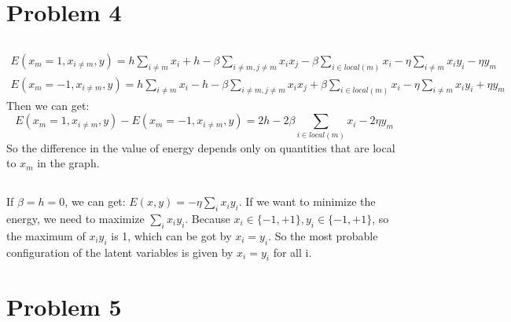 \documentclass[twoside]{article}
\begin{document}
\section{Problem 4}
\subsection{}
\begin{align*}
E(x_m=1, x_{i \neq m}, y) =  h\sum_{i\neq m}x_i + h -\beta \sum_{i\neq m, j\neq m}x_i x_j - \beta \sum_{i\in local(m)}x_i- \eta \sum_{i\neq m}x_iy_i - \eta y_m\\
E(x_m=-1, x_{i \neq m}, y) =  h\sum_{i\neq m}x_i - h -\beta \sum_{i\neq m, j\neq m}x_i x_j + \beta \sum_{i\in local(m)}x_i- \eta \sum_{i\neq m}x_iy_i + \eta y_m
\end{align*}
Then we can get:
$$E(x_m=1, x_{i \neq m}, y)  - E(x_m=-1, x_{i \neq m}, y) = 2h - 2\beta \sum_{i\in local(m)}x_i - 2\eta y_m$$
So the difference in the value of energy depends only on quantities that are local to $x_m$ in the graph.

\subsection{}
If $\beta = h = 0 $, we can get: $E(x,y) = - \eta \sum_i x_i y_i$. If we want to minimize the energy, we need to maximize $\sum_i x_iy_i$.
Because $x_i \in \{-1, +1\}, y_i \in\{-1, +1\}$, so the maximum of $x_iy_i$ is 1, which can be got by $x_i = y_i$. 
So the most probable configuration of the latent variables is given by $x_i = y_i$ for all i.

\section{Problem 5}
\end{document}
